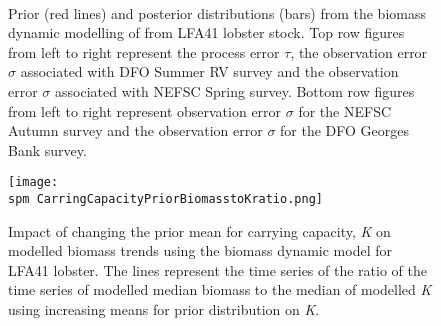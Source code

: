 \documentclass[11pt]{article}
\newcommand{\D}{.}
\newcommand{\spm}{/backup/bio_data/bio.lobster/spmodelling/lfa41/}
\begin{document}
\begin{landscape}
\begin{figure}
\centering
        \\
         \caption{Prior (red lines) and posterior distributions (bars) from the biomass dynamic modelling of from LFA41 lobster stock. Top row figures from left to right represent the process error $\tau$, the observation error $\sigma$ associated with DFO Summer RV survey and the observation error $\sigma$ associated with NEFSC Spring survey. Bottom row figures from left to right represent observation error $\sigma$ for the NEFSC Autumn survey and the observation error $\sigma$ for the DFO Georges Bank survey. }
       
        
\end{figure}
\end{landscape}
     \clearpage

\begin{figure}
\centering
\texttt{[image: \\spm CarringCapacityPriorBiomasstoKratio.png]}
\caption{Impact of changing the prior mean for carrying capacity, \emph{K} on modelled biomass trends using the biomass dynamic model for LFA41 lobster. The lines represent the time series of the ratio of the time series of modelled median biomass to the median of modelled \emph{K} using increasing means for prior distribution on \emph{K}. }

\end{figure}
     \clearpage
\end{document}
